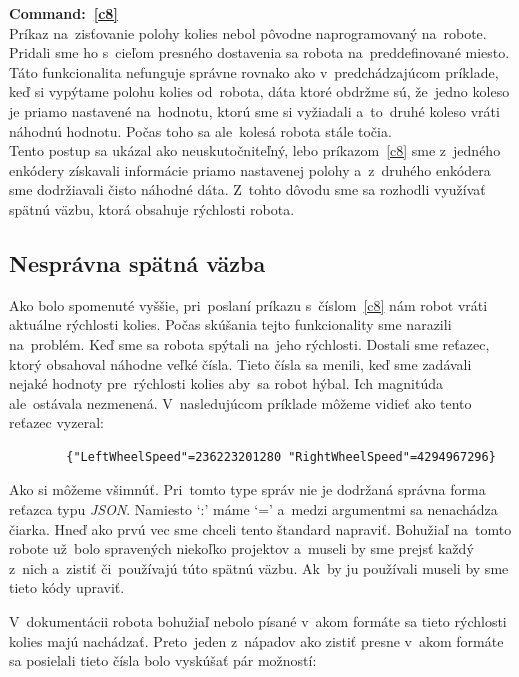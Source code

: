 \noindent \textbf{Command:~\ref{c8}} \\
\indent Príkaz na~zisťovanie polohy kolies nebol pôvodne naprogramovaný na~robote. Pridali sme ho s~cieľom presného
dostavenia sa robota na~preddefinované miesto. Táto funkcionalita nefunguje správne rovnako ako v~predchádzajúcom príklade,
keď si vypýtame polohu kolies od~robota, dáta ktoré obdržme sú, že~jedno koleso je priamo nastavené na~hodnotu, ktorú sme si
vyžiadali a~to~druhé koleso vráti náhodnú hodnotu. Počas toho sa ale~kolesá robota stále točia.\\

Tento postup sa ukázal ako neuskutočniteľný, lebo príkazom~\ref{c8} sme z~jedného enkódery
získavali informácie priamo nastavenej polohy a~z~druhého enkódera sme dodržiavali čisto náhodné dáta.
Z~tohto dôvodu sme sa rozhodli využívať spätnú väzbu, ktorá obsahuje rýchlosti robota.

\clearpage

\subsection{Nesprávna spätná väzba}
\label{subsec:wrongFeedback}

Ako bolo spomenuté vyššie, pri~poslaní príkazu s~číslom~\ref{c8} nám robot vráti aktuálne rýchlosti kolies. Počas skúšania tejto funkcionality
sme narazili na~problém. Keď sme sa robota spýtali na~jeho rýchlosti. Dostali sme reťazec, ktorý obsahoval náhodne veľké čísla. Tieto čísla sa
menili, keď sme zadávali nejaké hodnoty pre~rýchlosti kolies aby~sa robot hýbal. Ich magnitúda ale~ostávala nezmenená. V~nasledujúcom príklade
môžeme vidieť ako tento reťazec vyzeral:

\label{jsonWannabeSpeed}
\begin{lstlisting}
		{"LeftWheelSpeed"=236223201280 "RightWheelSpeed"=4294967296}
\end{lstlisting}

Ako si môžeme všimnúť. Pri~tomto type správ nie je dodržaná správna forma reťazca typu \textit{JSON}.
Namiesto `:' máme `=' a~medzi argumentmi sa nenachádza čiarka. Hneď ako prvú vec sme chceli tento štandard napraviť. Bohužiaľ na~tomto
robote už~bolo spravených niekoľko projektov a~museli by sme prejsť každý z~nich a~zistiť či~používajú túto spätnú väzbu. Ak~by ju používali
museli by sme tieto kódy upraviť.

V~dokumentácii robota bohužiaľ nebolo písané v~akom formáte sa tieto rýchlosti kolies majú nachádzať. Preto~jeden z~nápadov ako zistiť presne
v~akom formáte sa posielali tieto čísla bolo vyskúšať pár možností:

